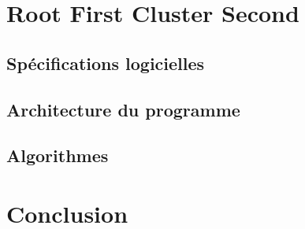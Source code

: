 \documentclass[twoside,UTF8]{EPURapport}
\begin{document}

\chapter{Root First Cluster Second}

\section{Spécifications logicielles}

\section{Architecture du programme}

\section{Algorithmes}


\chapter{Conclusion}

\annexes
\end{document}
